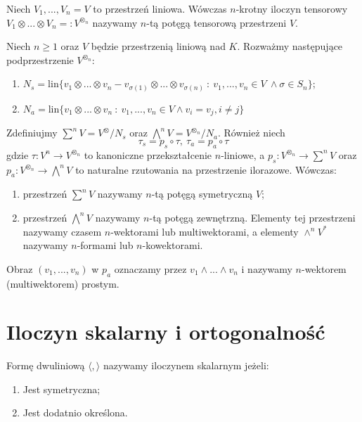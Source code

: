 \documentclass[11pt, a4paper]{article}
\begin{document}
\begin{definition}
    Niech \(V_1, ..., V_n = V\) to przestrzeń liniowa. Wówczas \(n\)-krotny iloczyn tensorowy
    \(V_1 \otimes ... \otimes V_n =: V^{\otimes_n}\) nazywamy \(n\)-tą potęgą
    tensorową przestrzeni \(V\).
\end{definition}

\begin{definition}
    Niech \(n \geq 1\) oraz \(V\) będzie przestrzenią liniową nad \(K\).
    Rozważmy następujące podprzestrzenie \(V^{\otimes_n}\):
    \begin{enumerate}
        \item \(N_s = \text{lin}\{v_1 \otimes ... \otimes v_n - v_{\sigma(1)}
        \otimes ... \otimes v_{\sigma(n)}\ :\ v_1, ..., v_n \in V \ \land \sigma \in S_n \}\);
        \item \(N_a = \text{lin}\{v_1 \otimes ... \otimes v_n\ :\ v_1, ..., v_n \in V \land v_i = v_j, i \not = j\}\)
    \end{enumerate}
    Zdefiniujmy \(\sum^{n}V = V^{\otimes} / N_s\) oraz \(\bigwedge^{n}V = V^{\otimes_n} / N_a\).
    Również niech
    \[
        \tau_s = p_s \circ \tau,\ \tau_a = p_a \circ \tau
    \]
    gdzie \(\tau: V^n \to V^{\otimes_n}\) to kanoniczne przekształcenie \(n\)-liniowe,
    a \(p_s: V^{\otimes_n} \to \sum^{n}V\) oraz \(p_a: V^{\otimes_n} \to \bigwedge^{n}V\)
    to naturalne rzutowania na przestrzenie ilorazowe. Wówczas:
    \begin{enumerate}
        \item przestrzeń \(\sum^{n}V\) nazywamy \(n\)-tą potęgą symetryczną \(V\);
        \item przestrzeń \(\bigwedge^{n}V\) nazywamy \(n\)-tą potęgą zewnętrzną.
        Elementy tej przestrzeni nazywamy czasem \(n\)-wektorami lub multiwektorami, a
        elementy \(\wedge^{n}V^{*}\) nazywamy \(n\)-formami lub \(n\)-kowektorami.
    \end{enumerate}
    Obraz \((v_1, ..., v_n)\) w \(p_a\) oznaczamy przez \(v_1 \wedge ... \wedge v_n\)
    i nazywamy \(n\)-wektorem (multiwektorem) prostym.
\end{definition}


\section{Iloczyn skalarny i ortogonalność}
\begin{definition}
    Formę dwuliniową \(\langle, \rangle\) nazywamy iloczynem skalarnym jeżeli:
    \begin{enumerate}
    \item Jest symetryczna;
    \item Jest dodatnio określona.
    \end{enumerate}
\end{definition}
\end{document}
